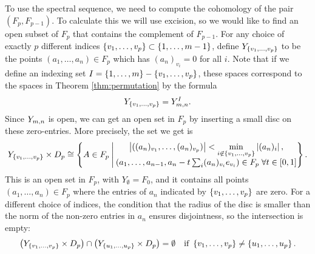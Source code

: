 To use the spectral sequence, we need to compute the cohomology of the
pair $(F_p,F_{p-1})$. To calculate this we will use excision, so we
would like to find an open subset of $F_p$ that contains the
complement of $F_{p-1}$. For any choice of exactly $p$ 
different indices $\left\{ v_1,\dots,v_p \right\}\subset \left\{ 1,\dots,m-1 \right\}$,
define $Y_{\left\{ v_1,\dots,v_p \right\}}$ to be the points $(a_1,\dots,a_n)\in
F_p$ which has $(a_n)_{v_i} = 0$ for all $i$.
Note that if we define an indexing set ${I =
  \left\{ 1,\dots,m \right\}-\left\{ v_1,\dots,v_p \right\}}$,
these spaces correspond to the spaces in Theorem
\ref{thm:permutation} by the formula
\[ Y_{\left\{ v_1,\dots,v_p \right\}} = Y_{m,n}^I. \]
Since $Y_{m,n}$ is open, we
can get an open set in $F_p$ by inserting a small disc on these
zero-entries. More precisely, the set we get is
\[ Y_{\left\{ v_1,\dots,v_p \right\}} \times D_p \cong \left\{  A\in F_p \:\Bigg\vert\: 
  \begin{matrix} \displaystyle 
    \left| ((a_n)_{v_1},\dots,(a_n)_{v_p}) \right| <
    \min_{i\not\in \left\{ v_1,\dots,v_p \right\}} \left| (a_n)_i \right|, \\
    \left(a_1,\dots,a_{n-1},a_n-t\sum_{i} (a_n)_{v_i}e_{v_i}\right)\in
    F_p \;\forall t \in [0,1]
  \end{matrix}  \right\}. \]
This is an open set in $F_p$, with $Y_{\emptyset} = F_0$, and it
contains all points $(a_1,\dots,a_n)\in F_p$ where the entries of
$a_n$ indicated by $\left\{ v_1,\dots,v_p \right\}$ are zero. For a different
choice of indices, the condition that the radius of the disc is
smaller than the norm of the non-zero entries in $a_n$ ensures
disjointness, so the intersection is empty:
\[ \left(Y_{\left\{ v_1,\dots,v_p \right\}}\times D_p\right) \cap \left(
  Y_{\left\{ u_1,\dots,u_p \right\}}\times D_p\right) = \emptyset \quad \text{if }
\left\{ v_1,\dots,v_p \right\} \neq \left\{ u_1,\dots,u_p \right\}. \]

